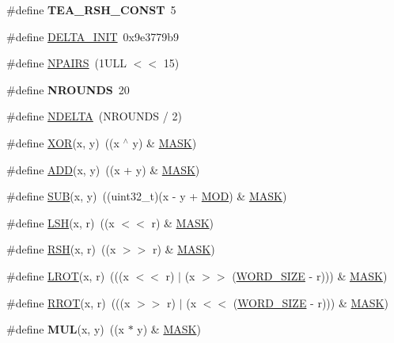 \begin{DoxyCompactItemize}
\item 
\hypertarget{common_8hh_a1ec83ee7323c66a4e4e4920b0540cc56}{\#define {\bfseries \-T\-E\-A\-\_\-\-R\-S\-H\-\_\-\-C\-O\-N\-S\-T}~5}\label{common_8hh_a1ec83ee7323c66a4e4e4920b0540cc56}

\item 
\#define \hyperlink{common_8hh_aa57f306d22334553a3fdfd2ad7f703d7}{\-D\-E\-L\-T\-A\-\_\-\-I\-N\-I\-T}~0x9e3779b9
\item 
\#define \hyperlink{common_8hh_ad8bbd29e2946d6b269e0009219061ad6}{\-N\-P\-A\-I\-R\-S}~(1\-U\-L\-L $<$$<$ 15)
\item 
\hypertarget{common_8hh_a92a76bc85ae6b57d8257f168e3927a29}{\#define {\bfseries \-N\-R\-O\-U\-N\-D\-S}~20}\label{common_8hh_a92a76bc85ae6b57d8257f168e3927a29}

\item 
\#define \hyperlink{common_8hh_ad918c7df882adba39ac2777fbf01248e}{\-N\-D\-E\-L\-T\-A}~(\-N\-R\-O\-U\-N\-D\-S / 2)
\item 
\#define \hyperlink{common_8hh_a6de9ec3b3b57377b69a82239ea52ec6e}{\-X\-O\-R}(x, y)~((x $^\wedge$ y) \& \hyperlink{common_8hh_ae7520c5477c11965aabeedc033c9862b}{\-M\-A\-S\-K})
\item 
\#define \hyperlink{common_8hh_af3b709fb668cf93ca09e2a46a2a031a8}{\-A\-D\-D}(x, y)~((x + y) \& \hyperlink{common_8hh_ae7520c5477c11965aabeedc033c9862b}{\-M\-A\-S\-K})
\item 
\#define \hyperlink{common_8hh_aafc2c4f262a0686c07f86c7d2e1d8d14}{\-S\-U\-B}(x, y)~((uint32\-\_\-t)(x -\/ y + \hyperlink{common_8hh_aca7d5718ab8c38506adb3bef2469b319}{\-M\-O\-D}) \& \hyperlink{common_8hh_ae7520c5477c11965aabeedc033c9862b}{\-M\-A\-S\-K})
\item 
\#define \hyperlink{common_8hh_ab0642bbe3fc1b4488b5fd0e8ea1d1d88}{\-L\-S\-H}(x, r)~((x $<$$<$ r) \& \hyperlink{common_8hh_ae7520c5477c11965aabeedc033c9862b}{\-M\-A\-S\-K})
\item 
\#define \hyperlink{common_8hh_aa1542fdafaf6b27d057c000486b42133}{\-R\-S\-H}(x, r)~((x $>$$>$ r) \& \hyperlink{common_8hh_ae7520c5477c11965aabeedc033c9862b}{\-M\-A\-S\-K})
\item 
\#define \hyperlink{common_8hh_abe2030c44a97657e1b1dbe9b0e093a7b}{\-L\-R\-O\-T}(x, r)~(((x $<$$<$ r) $|$ (x $>$$>$ (\hyperlink{common_8hh_a92ed8507d1cd2331ad09275c5c4c1c89}{\-W\-O\-R\-D\-\_\-\-S\-I\-Z\-E} -\/ r))) \& \hyperlink{common_8hh_ae7520c5477c11965aabeedc033c9862b}{\-M\-A\-S\-K})
\item 
\#define \hyperlink{common_8hh_af90d72110373ee39961a88b2256289c9}{\-R\-R\-O\-T}(x, r)~(((x $>$$>$ r) $|$ (x $<$$<$ (\hyperlink{common_8hh_a92ed8507d1cd2331ad09275c5c4c1c89}{\-W\-O\-R\-D\-\_\-\-S\-I\-Z\-E} -\/ r))) \& \hyperlink{common_8hh_ae7520c5477c11965aabeedc033c9862b}{\-M\-A\-S\-K})
\item 
\hypertarget{common_8hh_a3181b6978c9b47c96208263c73c8c4a7}{\#define {\bfseries \-M\-U\-L}(x, y)~((x $\ast$ y) \& \hyperlink{common_8hh_ae7520c5477c11965aabeedc033c9862b}{\-M\-A\-S\-K})}\label{common_8hh_a3181b6978c9b47c96208263c73c8c4a7}


\end{DoxyCompactItemize}
